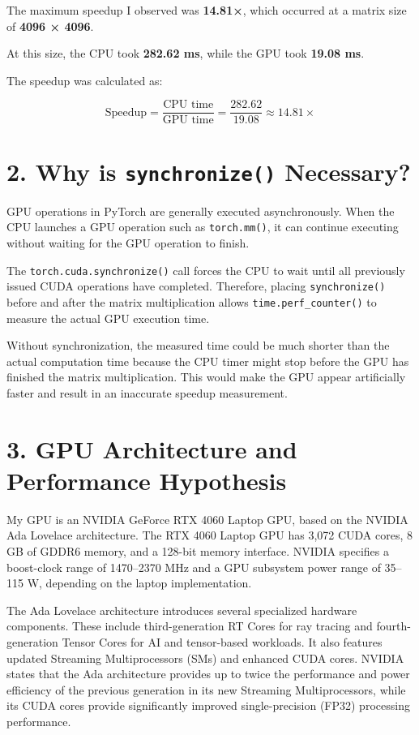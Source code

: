\documentclass[11pt]{article}
\begin{document}
The maximum speedup I observed was \textbf{14.81×}, which occurred at a
matrix size of \textbf{4096 × 4096}.

At this size, the CPU took \textbf{282.62 ms}, while the GPU took
\textbf{19.08 ms}.

The speedup was calculated as:

\[
\text{Speedup} = \frac{\text{CPU time}}{\text{GPU time}}
= \frac{282.62}{19.08}
\approx 14.81\times
\]

    \section{\texorpdfstring{2. Why is \texttt{synchronize()}
Necessary?}{2. Why is synchronize() Necessary?}}\label{why-is-synchronize-necessary}

GPU operations in PyTorch are generally executed asynchronously. When
the CPU launches a GPU operation such as \texttt{torch.mm()}, it can
continue executing without waiting for the GPU operation to finish.

The \texttt{torch.cuda.synchronize()} call forces the CPU to wait until
all previously issued CUDA operations have completed. Therefore, placing
\texttt{synchronize()} before and after the matrix multiplication allows
\texttt{time.perf\_counter()} to measure the actual GPU execution time.

Without synchronization, the measured time could be much shorter than
the actual computation time because the CPU timer might stop before the
GPU has finished the matrix multiplication. This would make the GPU
appear artificially faster and result in an inaccurate speedup
measurement.

    \section{3. GPU Architecture and Performance
Hypothesis}\label{gpu-architecture-and-performance-hypothesis}

My GPU is an NVIDIA GeForce RTX 4060 Laptop GPU, based on the NVIDIA Ada
Lovelace architecture. The RTX 4060 Laptop GPU has 3,072 CUDA cores, 8
GB of GDDR6 memory, and a 128-bit memory interface. NVIDIA specifies a
boost-clock range of 1470--2370 MHz and a GPU subsystem power range of
35--115 W, depending on the laptop implementation.

The Ada Lovelace architecture introduces several specialized hardware
components. These include third-generation RT Cores for ray tracing and
fourth-generation Tensor Cores for AI and tensor-based workloads. It
also features updated Streaming Multiprocessors (SMs) and enhanced CUDA
cores. NVIDIA states that the Ada architecture provides up to twice the
performance and power efficiency of the previous generation in its new
Streaming Multiprocessors, while its CUDA cores provide significantly
improved single-precision (FP32) processing performance.
\end{document}
